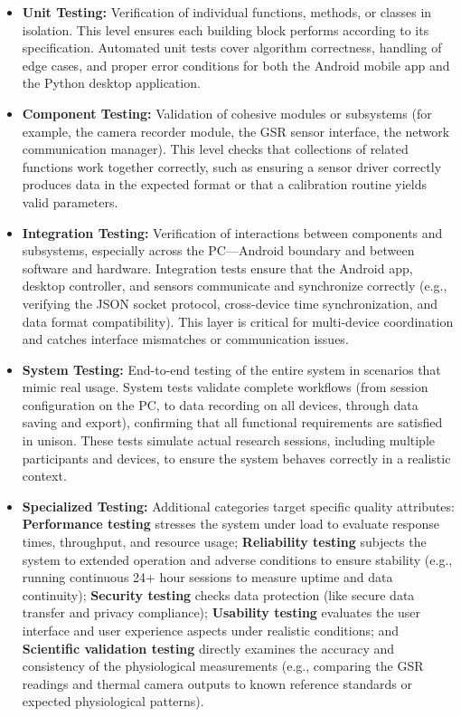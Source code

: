 \documentclass[11pt,a4paper]{report}
\begin{document}
\begin{itemize}
\item \textbf{Unit Testing:} Verification of individual functions, methods, or
  classes in isolation. This level ensures each building block performs
  according to its specification. Automated unit tests cover algorithm
  correctness, handling of edge cases, and proper error conditions for
  both the Android mobile app and the Python desktop application.
\item \textbf{Component Testing:} Validation of cohesive modules or subsystems
  (for example, the camera recorder module, the GSR sensor interface,
  the network communication manager). This level checks that collections
  of related functions work together correctly, such as ensuring a
  sensor driver correctly produces data in the expected format or that a
  calibration routine yields valid parameters.
\item \textbf{Integration Testing:} Verification of interactions between
  components and subsystems, especially across the PC---Android boundary
  and between software and hardware. Integration tests ensure that the
  Android app, desktop controller, and sensors communicate and
  synchronize correctly (e.g., verifying the JSON socket protocol,
  cross-device time synchronization, and data format compatibility).
  This layer is critical for multi-device coordination and catches
  interface mismatches or communication issues.
\item \textbf{System Testing:} End-to-end testing of the entire system in
  scenarios that mimic real usage. System tests validate complete
  workflows (from session configuration on the PC, to data recording on
  all devices, through data saving and export), confirming that all
  functional requirements are satisfied in unison. These tests simulate
  actual research sessions, including multiple participants and devices,
  to ensure the system behaves correctly in a realistic context.
\item \textbf{Specialized Testing:} Additional categories target specific quality
  attributes: \textbf{Performance testing} stresses the system under load to
  evaluate response times, throughput, and resource usage; \textbf{Reliability
  testing} subjects the system to extended operation and adverse
  conditions to ensure stability (e.g., running continuous 24+ hour
  sessions to measure uptime and data continuity); \textbf{Security testing}
  checks data protection (like secure data transfer and privacy
  compliance); \textbf{Usability testing} evaluates the user interface and
  user experience aspects under realistic conditions; and \textbf{Scientific
  validation testing} directly examines the accuracy and consistency of
  the physiological measurements (e.g., comparing the GSR readings and
  thermal camera outputs to known reference standards or expected
  physiological patterns).

\end{itemize}
\end{document}
